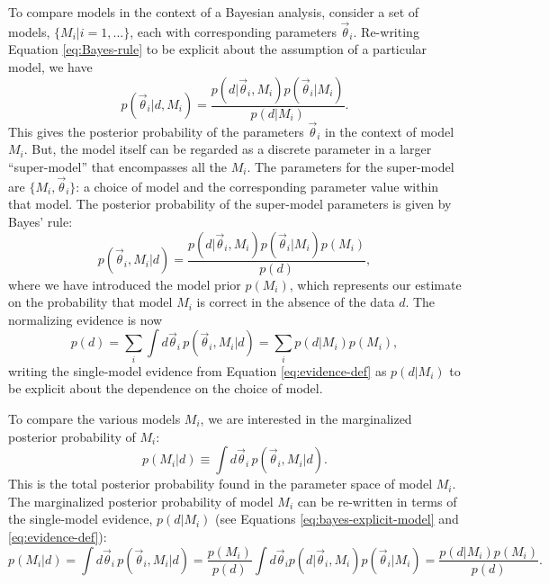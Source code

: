 \documentclass[preprint]{aastex}
\newcommand{\vtheta}{\vec{\theta}}
\begin{document}
To compare models in the context of a Bayesian analysis, consider a
set of models, $\{M_i| i = 1, \ldots\}$, each with corresponding
parameters $\vtheta_i$.  Re-writing Equation \eqref{eq:Bayes-rule} to
be explicit about the assumption of a particular model, we have
\begin{equation}
  p(\vtheta_i | d, M_i) = \frac{p(d|\vtheta_i, M_i) p(\vtheta_i | M_i)}{p(d|M_i)}.
\end{equation}
This gives the posterior probability of the parameters $\vtheta_i$ in
the context of model $M_i$.  But, the model itself can be regarded as
a discrete parameter in a larger ``super-model'' that encompasses all
the $M_i$.  The parameters for the super-model are $\{M_i,
\vtheta_i\}$: a choice of model and the corresponding parameter value
within that model.  The posterior probability of the super-model
parameters is given by Bayes' rule:
\begin{equation}
  \label{eq:bayes-explicit-model}
  p(\vtheta_i, M_i|d) = \frac{p(d|\vtheta_i, M_i) p(\vtheta_i |M_i) p(M_i)}{p(d)},
\end{equation}
where we have introduced the model prior $p(M_i)$, which represents
our estimate on the probability that model $M_i$ is correct in the
absence of the data $d$.  The normalizing evidence is now
\begin{equation}
  \label{eq:multi-model-evidence-def}
  p(d) = \sum_i \int d\vtheta_i\, p(\vtheta_i, M_i|d) = \sum_i
  p(d|M_i) p(M_i),
\end{equation}
writing the single-model evidence from Equation
\eqref{eq:evidence-def} as $p(d|M_i)$ to be explicit about the
dependence on the choice of model.

To compare the various models $M_i$, we are interested in the
marginalized posterior probability of $M_i$:
\begin{equation}
  \label{eq:model-posterior-def}
  p(M_i|d) \equiv \int d\vtheta_i\, p(\vtheta_i, M_i|d).
\end{equation}
This is the total posterior probability found in the parameter space
of model $M_i$.  The marginalized posterior probability of model $M_i$
can be re-written in terms of the single-model evidence, $p(d|M_i)$
(see Equations \eqref{eq:bayes-explicit-model} and
\eqref{eq:evidence-def}):
\begin{equation}
  \label{eq:model-evidence-def}
  p(M_i|d) = \int d\vtheta_i\, p(\vtheta_i, M_i|d) = \frac{p(M_i)}{p(d)} \int d\vtheta_i
  p(d|\vtheta_i,M_i) p(\vtheta_i|M_i) = \frac{p(d|M_i) p(M_i)}{p(d)}.
\end{equation}
\end{document}

